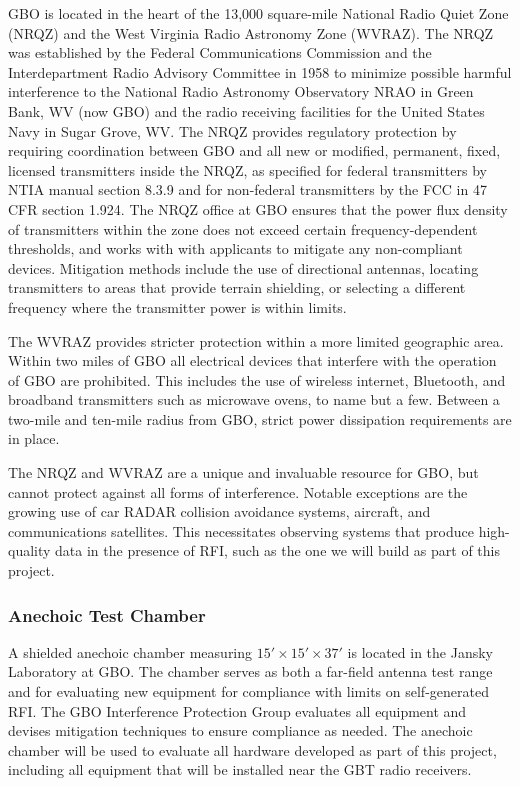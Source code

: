 \documentclass[10pt]{NSF}
\begin{document}
GBO is located in the heart of the 13,000 square-mile National Radio
Quiet Zone (NRQZ) and the West Virginia Radio Astronomy Zone (WVRAZ).
The NRQZ was established by the Federal Communications Commission and
the Interdepartment Radio Advisory Committee in 1958 to minimize
possible harmful interference to the National Radio Astronomy
Observatory NRAO in Green Bank, WV (now GBO) and the radio receiving
facilities for the United States Navy in Sugar Grove, WV.  The NRQZ
provides regulatory protection by requiring coordination between GBO
and all new or modified, permanent, fixed, licensed transmitters inside
the NRQZ, as specified for federal transmitters by NTIA manual section
8.3.9 and for non-federal transmitters by the FCC in 47 CFR section
1.924.  The NRQZ office at GBO ensures that the power flux density of
transmitters within the zone does not exceed certain
frequency-dependent thresholds, and works with with applicants to
mitigate any non-compliant devices.  Mitigation methods include the use
of directional antennas, locating transmitters to areas that provide
terrain shielding, or selecting a different frequency where the
transmitter power is within limits.

The WVRAZ provides stricter protection within a more limited
geographic area.  Within two miles of GBO all electrical devices that
interfere with the operation of GBO are prohibited.  This includes the
use of wireless internet, Bluetooth, and broadband transmitters such
as microwave ovens, to name but a few.  Between a two-mile and
ten-mile radius from GBO, strict power dissipation requirements are in
place.

The NRQZ and WVRAZ are a unique and invaluable resource for GBO, but
cannot protect against all forms of interference.  Notable exceptions
are the growing use of car RADAR collision avoidance systems,
aircraft, and communications satellites.  This necessitates observing
systems that produce high-quality data in the presence of RFI, such as
the one we will build as part of this project.

\subsubsection{Anechoic Test Chamber}

A shielded anechoic chamber measuring $15' \times 15' \times 37'$ is
located in the Jansky Laboratory at GBO.  The chamber serves as both a
far-field antenna test range and for evaluating new equipment for
compliance with limits on self-generated RFI.  The GBO Interference
Protection Group evaluates all equipment and devises mitigation
techniques to ensure compliance as needed.  The anechoic chamber will
be used to evaluate all hardware developed as part of this project,
including all equipment that will be installed near the GBT radio
receivers.
\end{document}
